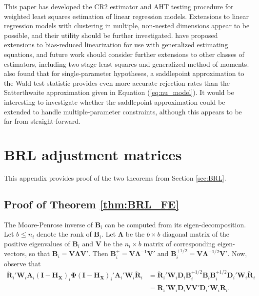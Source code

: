 \documentclass[draft]{ectaart}\usepackage[]{graphicx}\usepackage[]{color}
\newcommand{\bm}{\mathbf}
\newcommand{\bs}{\boldsymbol}
\begin{document}
This paper has developed the CR2 estimator and AHT testing procedure for weighted least squares estimation of linear regression models. 
Extensions to linear regression models with clustering in multiple, non-nested dimensions \citep[cf.][]{Cameron2011robust} appear to be possible, and their utility should be further investigated. 
\citet{McCaffrey2006improved} have proposed extensions to bias-reduced linearization for use with generalized estimating equations, and future work should consider further extensions to other classes of estimators, including two-stage least squares and generalized method of moments. 
\citet{McCaffrey2006improved} also found that for single-parameter hypotheses, a saddlepoint approximation to the Wald test statistic provides even more accurate rejection rates than the Satterthwaite approximation given in Equation (\ref{eq:nu_model}). 
It would be interesting to investigate whether the saddlepoint approximation could be extended to handle multiple-parameter constraints, although this appears to be far from straight-forward. 

\appendix

\section{BRL adjustment matrices}
\label{app:theorems}

This appendix provides proof of the two theorems from Section \ref{sec:BRL}. 

\subsection{Proof of Theorem \ref{thm:BRL_FE}}

The Moore-Penrose inverse of $\bm{B}_i$ can be computed from its eigen-decomposition. Let $b \leq n_i$ denote the rank of $\bm{B}_i$. 
Let $\bs\Lambda$ be the $b \times b$ diagonal matrix of the positive eigenvalues of $\bm{B}_i$ and $\bm{V}$ be the $n_i \times b$ matrix of corresponding eigen-vectors, so that $\bm{B}_i = \bm{V}\bs\Lambda\bm{V}'$. 
Then $\bm{B}_i^+ = \bm{V}\bs\Lambda^{-1}\bm{V}'$ and $\bm{B}_i^{+1/2} = \bm{V}\bs\Lambda^{-1/2}\bm{V}'$. Now, observe that 
\begin{align}
\label{eq:step1}
\bm{\ddot{R}}_i' \bm{W}_i \bm{A}_i \left(\bm{I} - \bm{H_X}\right)_i \bs\Phi \left(\bm{I} - \bm{H_X}\right)_i' \bm{A}_i' \bm{W}_i \bm{\ddot{R}}_i &= \bm{\ddot{R}}_i' \bm{W}_i \bm{D}_i \bm{B}_i^{+1/2} \bm{B}_i \bm{B}_i^{+1/2} \bm{D}_i' \bm{W}_i \bm{\ddot{R}}_i \nonumber \\
&= \bm{\ddot{R}}_i' \bm{W}_i \bm{D}_i \bm{V}\bm{V}' \bm{D}_i' \bm{W}_i \bm{\ddot{R}}_i. 
\end{align}
\end{document}
